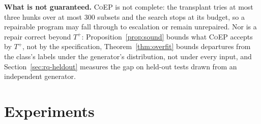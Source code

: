 \documentclass[acmsmall,screen,review,anonymous,nonacm]{acmart}
\newcommand{\tool}{\textsc{CoEP}\xspace}
\begin{document}
\textbf{What is not guaranteed.} \tool is not complete: the transplant tries at most three hunks over at most 300 subsets and the search stops at its budget, so a repairable program may fall through to escalation or remain unrepaired. Nor is a repair correct beyond $T^{+}$: Proposition~\ref{prop:sound} bounds what \tool accepts by $T^{+}$, not by the specification, Theorem~\ref{thm:overfit} bounds departures from the class's labels under the generator's distribution, not under every input, and Section~\ref{sec:rq-heldout} measures the gap on held-out tests drawn from an independent generator.

\section{Experiments}
\label{sec:exp}
\end{document}
